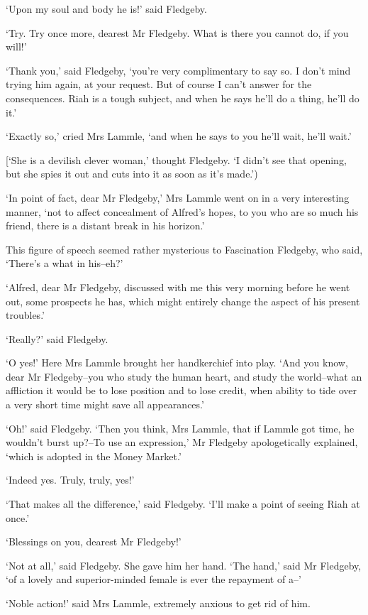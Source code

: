 ‘Upon my soul and body he is!’ said Fledgeby.

‘Try. Try once more, dearest Mr Fledgeby. What is there you cannot do,
if you will!’

‘Thank you,’ said Fledgeby, ‘you’re very complimentary to say so. I
don’t mind trying him again, at your request. But of course I can’t
answer for the consequences. Riah is a tough subject, and when he says
he’ll do a thing, he’ll do it.’

‘Exactly so,’ cried Mrs Lammle, ‘and when he says to you he’ll wait,
he’ll wait.’

[‘She is a devilish clever woman,’ thought Fledgeby. ‘I didn’t see that
opening, but she spies it out and cuts into it as soon as it’s made.’)

‘In point of fact, dear Mr Fledgeby,’ Mrs Lammle went on in a very
interesting manner, ‘not to affect concealment of Alfred’s hopes, to you
who are so much his friend, there is a distant break in his horizon.’

This figure of speech seemed rather mysterious to Fascination Fledgeby,
who said, ‘There’s a what in his--eh?’

‘Alfred, dear Mr Fledgeby, discussed with me this very morning before he
went out, some prospects he has, which might entirely change the aspect
of his present troubles.’

‘Really?’ said Fledgeby.

‘O yes!’ Here Mrs Lammle brought her handkerchief into play. ‘And you
know, dear Mr Fledgeby--you who study the human heart, and study the
world--what an affliction it would be to lose position and to lose
credit, when ability to tide over a very short time might save all
appearances.’

‘Oh!’ said Fledgeby. ‘Then you think, Mrs Lammle, that if Lammle
got time, he wouldn’t burst up?--To use an expression,’ Mr Fledgeby
apologetically explained, ‘which is adopted in the Money Market.’

‘Indeed yes. Truly, truly, yes!’

‘That makes all the difference,’ said Fledgeby. ‘I’ll make a point of
seeing Riah at once.’

‘Blessings on you, dearest Mr Fledgeby!’

‘Not at all,’ said Fledgeby. She gave him her hand. ‘The hand,’ said Mr
Fledgeby, ‘of a lovely and superior-minded female is ever the repayment
of a--’

‘Noble action!’ said Mrs Lammle, extremely anxious to get rid of him.

